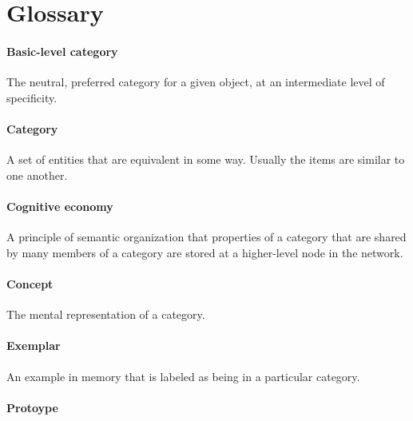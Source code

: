 \documentclass[
]{krantz}
\begin{document}
\section{Glossary}\label{glossary-6}

\paragraph*{Basic-level category}\label{basic-level-category}

The neutral, preferred category for a given object, at an intermediate level of specificity.

\paragraph*{Category}\label{category}

A set of entities that are equivalent in some way. Usually the items are similar to one another.

\paragraph*{Cognitive economy}\label{cognitive-economy}

A principle of semantic organization that properties of a category that are shared by many members of a category are stored at a higher-level node in the network.

\paragraph*{Concept}\label{concept}

The mental representation of a category.

\paragraph*{Exemplar}\label{exemplar}

An example in memory that is labeled as being in a particular category.

\paragraph*{Protoype}\label{protoype}
\end{document}
